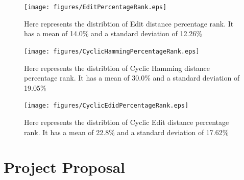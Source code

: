 \documentclass[12pt,twoside,notitlepage]{report}
\begin{document}
\begin{figure}[h]			\centerline{\texttt{[image: figures/EditPercentageRank.eps]}}
			\caption{\label{fig:Edit Percentage Ranking} Here represents the distribtion of Edit distance percentage rank. It has a mean of 14.0\% and a standard deviation of 12.26\%}
\end{figure}

\begin{figure}[h]
			\centerline{\texttt{[image: figures/CyclicHammingPercentageRank.eps]}}
			\caption{\label{fig:Cyclic Hamming Percentage Rank} Here represents the distribtion of Cyclic Hamming distance percentage rank. It has a mean of 30.0\% and a standard deviation of 19.05\%}
\end{figure}

\begin{figure}[h]
			\centerline{\texttt{[image: figures/CyclicEdidPercentageRank.eps]}}
			\caption{\label{fig:Cyclic Edit Percentage Rank} Here represents the distribtion of Cyclic Edit distance percentage rank. It has a mean of 22.8\% and a standard deviation of 17.62\%}
			\end{figure}
			
			
\chapter{Project Proposal}
			
\end{document}
